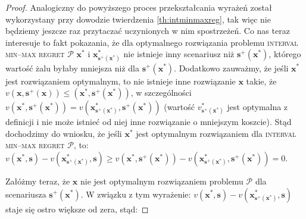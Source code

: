 \begin{proof}
	Analogiczny do powyższego proces przekształcania wyrażeń został wykorzystany przy dowodzie twierdzenia \ref{th:intminmaxreg}, tak więc nie będziemy jeszcze raz przytaczać uczynionych w nim spostrzeżeń. Co nas teraz interesuje to fakt pokazania, że dla optymalnego rozwiązania problemu \textsc{interval min--max regret $\mathcal{P}$} $\textbf{x}^{\ast}$ i $\textbf{x}^{\ast}_{\textbf{s}^{+} \left( \textbf{x}^{\ast} \right)}$ nie istnieje inny scenariusz niż $\textbf{s}^{+} \left( \textbf{x}^{\ast} \right)$, którego wartość żalu byłaby mniejsza niż dla $\textbf{s}^{+} \left( \textbf{x}^{\ast} \right)$. Dodatkowo zauważmy, że jeśli $\textbf{x}^{\ast}$ jest rozwiązaniem optymalnym, to nie istnieje inne rozwiązanie $\textbf{x}$ takie, że $v \left( \textbf{x}, \textbf{s}^{+} \left( \textbf{x} \right) \right) \leqslant \left( \textbf{x}^{\ast}, \textbf{s}^{+} \left( \textbf{x}^{\ast} \right) \right)$, w szczególności $v \left( \textbf{x}^{\ast}, \textbf{s}^{+} \left( \textbf{x}^{\ast} \right) \right) = v \left( \textbf{x}^{\ast}_{\textbf{s}^{+} \left( \textbf{x}^{\ast} \right)}, \textbf{s}^{+} \left( \textbf{x}^{\ast} \right) \right)$ (wartość $v^{\ast}_{\textbf{s}^{+} \left( \textbf{x}^{\ast} \right)}$ jest optymalna z definicji i nie może istnieć od niej inne rozwiązanie o mniejszym koszcie). Stąd dochodzimy do wniosku, że jeśli $\textbf{x}^{\ast}$ jest optymalnym rozwiązaniem dla \textsc{interval min--max regret $\mathcal{P}$}, to: $v \left( \textbf{x}^{\ast}, \textbf{s} \right) - v \left( \textbf{x}^{\ast}_{\textbf{s}^{+} \left( \textbf{x}^{\ast} \right)}, \textbf{s} \right) \geqslant v \left( \textbf{x}^{\ast}, \textbf{s}^{+} \left( \textbf{x}^{\ast} \right) \right) - v \left( \textbf{x}^{\ast}_{\textbf{s}^{+} \left( \textbf{x}^{\ast} \right)}, \textbf{s}^{+} \left( \textbf{x}^{\ast} \right) \right) = 0$.
	
	Załóżmy teraz, że $\textbf{x}$ nie jest optymalnym rozwiązaniem problemu $\mathcal{P}$ dla scenariusza $\textbf{s}^{+} \left( \textbf{x}^{\ast} \right)$. W związku z tym wyrażenie: $v \left( \textbf{x}^{\ast}, \textbf{s} \right) - v \left( \textbf{x}^{\ast}_{\textbf{s}^{+} \left( \textbf{x}^{\ast} \right)}, \textbf{s} \right)$ staje się ostro większe od zera, stąd:
	

\end{proof}
